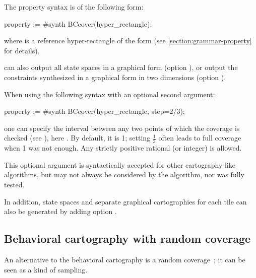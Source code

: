 The property syntax is of the following form:

\begin{IMITATORproperty}
property := #synth BCcover(hyper_rectangle);
\end{IMITATORproperty}

\noindent{}
where  is a reference hyper-rectangle of the form  (see \cref{section:grammar-property} for details).


\imitator{} can also
output all state spaces in a graphical form (option ),
or
output the constraints synthesized in a graphical form in two dimensions (option ).

When using the following syntax with an optional second argument:

\begin{IMITATORproperty}
property := #synth BCcover(hyper_rectangle, step=2/3);
\end{IMITATORproperty}

\noindent one can specify the interval between any two points of which the coverage is checked (see \cite{AF10}), here .
By default, it is 1; setting $\frac{1}{3}$ often leads to full coverage when 1 was not enough.
Any strictly positive rational (or integer) is allowed.

\begin{becareful}
	This optional argument is syntactically accepted for other cartography-like algorithms, but may not always be considered by the algorithm, nor was fully tested.
\end{becareful}

In addition, state spaces and separate graphical cartographies for each tile can also be generated by adding option .


\subsection*{Behavioral cartography with random coverage}\label{sss:mode:BC:random}

An alternative to the behavioral cartography is a random coverage~\cite{AF10}; it can be seen as a kind of sampling.

